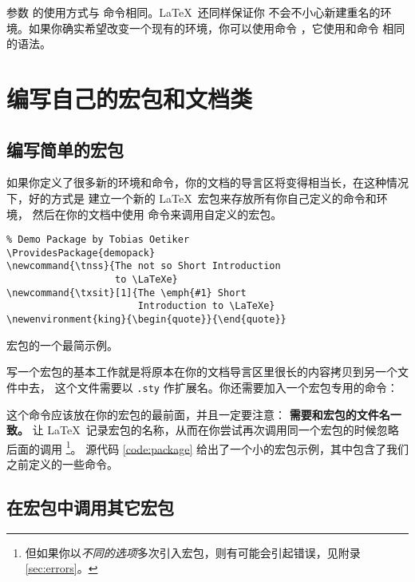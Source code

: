 参数  的使用方式与  命令相同。\LaTeX\ 还同样保证你
不会不小心新建重名的环境。如果你确实希望改变一个现有的环境，你可以使用命令
 ，它使用和命令  相同的语法。

\section{编写自己的宏包和文档类}\label{sec:packages}

\subsection{编写简单的宏包}\label{subsec:provide-pkg}

如果你定义了很多新的环境和命令，你的文档的导言区将变得相当长，在这种情况下，好的方式是
建立一个新的 \LaTeX\ 宏包来存放所有你自己定义的命令和环境，
然后在你的文档中使用  命令来调用自定义的宏包。

\begin{sourcecode}[htbp]
\begin{Verbatim}
% Demo Package by Tobias Oetiker
\ProvidesPackage{demopack}
\newcommand{\tnss}{The not so Short Introduction
                   to \LaTeXe}
\newcommand{\txsit}[1]{The \emph{#1} Short
                       Introduction to \LaTeXe}
\newenvironment{king}{\begin{quote}}{\end{quote}}
\end{Verbatim}
\caption{宏包的一个最简示例。}\label{code:package}
\end{sourcecode}

写一个宏包的基本工作就是将原本在你的文档导言区里很长的内容拷贝到另一个文件中去，
 这个文件需要以 \texttt{.sty} 作扩展名。你还需要加入一个宏包专用的命令：
\begin{command}
\end{command}
这个命令应该放在你的宏包的最前面，并且一定要注意：\textbf{ 需要和宏包的文件名一致。}
 让 \LaTeX\ 记录宏包的名称，从而在你尝试再次调用同一个宏包的时候忽略后面的调用%
\footnote{但如果你以\emph{不同的选项}多次引入宏包，则有可能会引起错误，见附录 \ref{sec:errors}。}。
源代码 \ref{code:package} 给出了一个小的宏包示例，其中包含了我们之前定义的一些命令。

\subsection{在宏包中调用其它宏包}\label{subsec:require-pkg}

